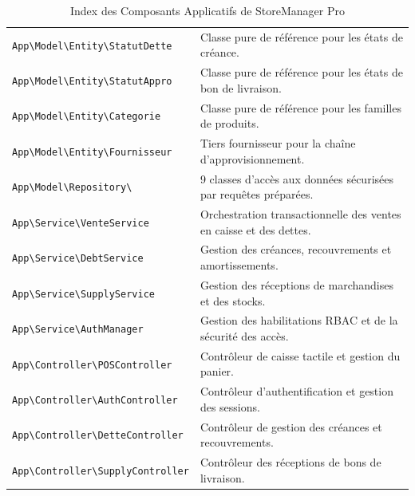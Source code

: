 \documentclass[11pt,a4paper,titlepage,twoside,openright]{report}
\begin{document}
\begin{table}[htbp]
\begin{tabularx}{\textwidth}{lX}
\texttt{App\textbackslash Model\textbackslash Entity\textbackslash StatutDette} & Classe pure de référence pour les états de créance. \\
\texttt{App\textbackslash Model\textbackslash Entity\textbackslash StatutAppro} & Classe pure de référence pour les états de bon de livraison. \\
\texttt{App\textbackslash Model\textbackslash Entity\textbackslash Categorie} & Classe pure de référence pour les familles de produits. \\
\texttt{App\textbackslash Model\textbackslash Entity\textbackslash Fournisseur} & Tiers fournisseur pour la chaîne d'approvisionnement. \\
\texttt{App\textbackslash Model\textbackslash Repository\textbackslash *} & 9 classes d'accès aux données sécurisées par requêtes préparées. \\
\texttt{App\textbackslash Service\textbackslash VenteService} & Orchestration transactionnelle des ventes en caisse et des dettes. \\
\texttt{App\textbackslash Service\textbackslash DebtService} & Gestion des créances, recouvrements et amortissements. \\
\texttt{App\textbackslash Service\textbackslash SupplyService} & Gestion des réceptions de marchandises et des stocks. \\
\texttt{App\textbackslash Service\textbackslash AuthManager} & Gestion des habilitations RBAC et de la sécurité des accès. \\
\texttt{App\textbackslash Controller\textbackslash POSController} & Contrôleur de caisse tactile et gestion du panier. \\
\texttt{App\textbackslash Controller\textbackslash AuthController} & Contrôleur d'authentification et gestion des sessions. \\
\texttt{App\textbackslash Controller\textbackslash DetteController} & Contrôleur de gestion des créances et recouvrements. \\
\texttt{App\textbackslash Controller\textbackslash SupplyController} & Contrôleur des réceptions de bons de livraison. \\
\bottomrule
\end{tabularx}
\caption{Index des Composants Applicatifs de StoreManager Pro}
\end{table}
\end{document}
